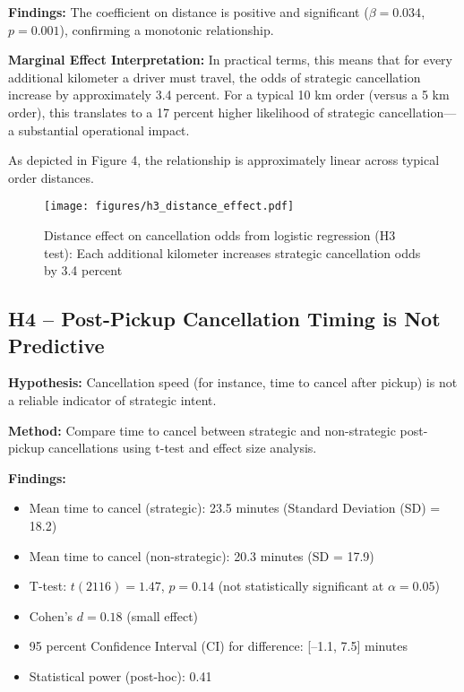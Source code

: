 \textbf{Findings:} The coefficient on distance is positive and significant ($\beta = 0.034$, $p = 0.001$), confirming a monotonic relationship.

\textbf{Marginal Effect Interpretation:} In practical terms, this means that for every additional kilometer a driver must travel, the odds of strategic cancellation increase by approximately 3.4 percent. For a typical 10 km order (versus a 5 km order), this translates to a 17 percent higher likelihood of strategic cancellation—a substantial operational impact.

As depicted in Figure 4, the relationship is approximately linear across typical order distances.

\begin{figure}[H]
\centering
\texttt{[image: figures/h3\_distance\_effect.pdf]}
\caption{Distance effect on cancellation odds from logistic regression (H3 test): Each additional kilometer increases strategic cancellation odds by 3.4 percent}
\label{fig:h3_distance}
\end{figure}

\subsection{H4 -- Post-Pickup Cancellation Timing is Not Predictive}

\textbf{Hypothesis:} Cancellation speed (for instance, time to cancel after pickup) is not a reliable indicator of strategic intent.

\textbf{Method:} Compare time to cancel between strategic and non-strategic post-pickup cancellations using t-test and effect size analysis.

\textbf{Findings:}  
\begin{itemize}
    \item Mean time to cancel (strategic): 23.5 minutes (Standard Deviation (SD) = 18.2)
    \item Mean time to cancel (non-strategic): 20.3 minutes (SD = 17.9)
    \item T-test: $t(2116) = 1.47$, $p = 0.14$ (not statistically significant at $\alpha = 0.05$)
    \item Cohen's $d = 0.18$ (small effect)
    \item 95 percent Confidence Interval (CI) for difference: [--1.1, 7.5] minutes
    \item Statistical power (post-hoc): 0.41
\end{itemize}

